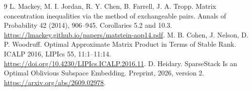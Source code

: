 \documentclass[11pt]{article}
\begin{document}
\begin{thebibliography}{9}
 L. Mackey, M. I. Jordan, R. Y. Chen, B. Farrell, J. A. Tropp.
Matrix concentration inequalities via the method of exchangeable pairs.
Annals of Probability 42 (2014), 906--945.
Corollaries 5.2 and 10.3.
\url{https://lmackey.github.io/papers/matstein-aop14.pdf}.
 M. B. Cohen, J. Nelson, D. P. Woodruff.
Optimal Approximate Matrix Product in Terms of Stable Rank.
ICALP 2016, LIPIcs 55, 11:1--11:14.
\url{https://doi.org/10.4230/LIPIcs.ICALP.2016.11}.
 D. Heidary.
SparseStack Is an Optimal Oblivious Subspace Embedding.
Preprint, 2026, version 2.
\url{https://arxiv.org/abs/2609.02978}.
\end{thebibliography}
\end{document}
